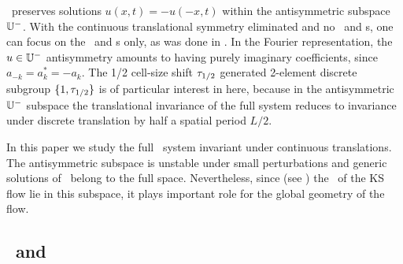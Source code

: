 {\PublicPrivate{%
        }{ %
    \PC{this is not as in \refref{KNSks90}, I might be wrong}
The nonlinear term $(u^2)_x$ in
the KS equation mixes these subspaces, leading
to four invariant subspaces (labeled by the
corresponding projection operators\rf{KNSks90}):
\begin{romannum} %
 \item[$\bbU^-$:] The space of antisymmetric functions,
 \item[$\Shift_1$:] The space of $L/2$ periodic functions,
 \item[$\bbU^{-,\Shift}$:] The intersection of the above two,
 \item[$\mathbf{L}$:]
The space of functions invariant under $x\mapsto L/2-x,\ u\mapsto -u$.
\end{romannum} %
        } %
%
\KSe\ preserves solutions $u(x,t)=-u(-x,t)$ within the
antisymmetric subspace $\bbU^-$.
With the continuous
translational symmetry eliminated and no
\reqva\ and \rpo s, one
can focus on the \eqva\ and \po s only, as was done
in .
In the Fourier
representation, the $u \in \mathbb{U}^-$ antisymmetry
amounts to having purely imaginary
coefficients, since $a_{-k}= a^\ast_k = -a_k$.
The 1/2 cell-size shift $\tau_{1/2}$
generated 2-element discrete subgroup
$\{1,\tau_{1/2}\}$ is
of particular interest in here,
because in the antisymmetric $\bbU^-$
subspace the translational invariance of the full system reduces to
invariance under discrete translation  by half a
spatial period $L/2$.

In
this paper we study the full \KS\ system invariant under continuous
translations.
The antisymmetric subspace  is unstable
under small perturbations and generic solutions of \KSe\ belong to
the full space. Nevertheless, since (see
) the \eqva\ of the KS flow
lie in this subspace, it plays important role for the global
geometry of the flow.
        } %

\subsection{\Eqva\ and \reqva} %
\label{sec:stks}

